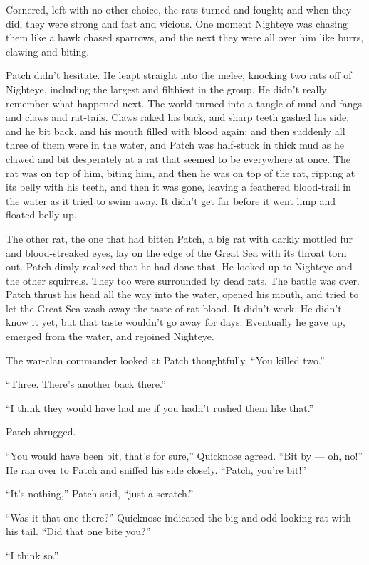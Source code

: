 \documentclass[ebook,oneside,openany,17pt]{memoir}
\begin{document}
Cornered, left with no other choice, the rats turned and fought; and
when they did, they were strong and fast and vicious. One moment
Nighteye was chasing them like a hawk chased sparrows, and the next
they were all over him like burrs, clawing and biting.

Patch didn’t hesitate. He leapt straight into the melee, knocking two
rats off of Nighteye, including the largest and filthiest in the
group. He didn’t really remember what happened next. The world turned
into a tangle of mud and fangs and claws and rat-tails. Claws raked
his back, and sharp teeth gashed his side; and he bit back, and his
mouth filled with blood again; and then suddenly all three of them
were in the water, and Patch was half-stuck in thick mud as he clawed
and bit desperately at a rat that seemed to be everywhere at once. The
rat was on top of him, biting him, and then he was on top of the rat,
ripping at its belly with his teeth, and then it was gone, leaving a
feathered blood-trail in the water as it tried to swim away. It didn’t
get far before it went limp and floated belly-up.

The other rat, the one that had bitten Patch, a big rat with darkly
mottled fur and blood-streaked eyes, lay on the edge of the Great Sea
with its throat torn out. Patch dimly realized that he had done
that. He looked up to Nighteye and the other squirrels. They too were
surrounded by dead rats. The battle was over. Patch thrust his head
all the way into the water, opened his mouth, and tried to let the
Great Sea wash away the taste of rat-blood. It didn’t work. He didn’t
know it yet, but that taste wouldn’t go away for days. Eventually he
gave up, emerged from the water, and rejoined Nighteye.

The war-clan commander looked at Patch thoughtfully. “You killed two.”

“Three. There’s another back there.”

“I think they would have had me if you hadn’t rushed them like that.”

Patch shrugged.

“You would have been bit, that’s for sure,” Quicknose agreed. “Bit by
— oh, no!” He ran over to Patch and sniffed his side closely. “Patch,
you’re bit!”

“It’s nothing,” Patch said, “just a scratch.”

“Was it that one there?” Quicknose indicated the big and odd-looking
rat with his tail. “Did that one bite you?”

“I think so.”
\end{document}
